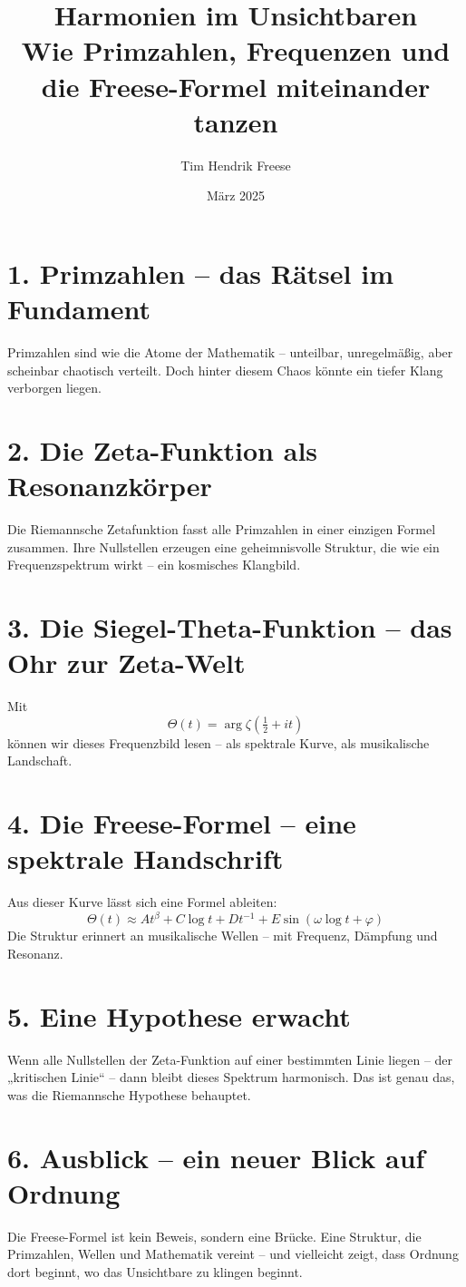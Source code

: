 \documentclass[12pt]{article}
\title{Harmonien im Unsichtbaren\\
\large Wie Primzahlen, Frequenzen und die Freese-Formel miteinander tanzen}
\author{Tim Hendrik Freese}
\date{März 2025}
\begin{document}
\maketitle

\section*{1. Primzahlen – das Rätsel im Fundament}

Primzahlen sind wie die Atome der Mathematik – unteilbar, unregelmäßig, aber scheinbar chaotisch verteilt.  
Doch hinter diesem Chaos könnte ein tiefer Klang verborgen liegen.

\section*{2. Die Zeta-Funktion als Resonanzkörper}

Die Riemannsche Zetafunktion fasst alle Primzahlen in einer einzigen Formel zusammen. Ihre Nullstellen erzeugen eine geheimnisvolle Struktur, die wie ein Frequenzspektrum wirkt – ein kosmisches Klangbild.

\section*{3. Die Siegel-Theta-Funktion – das Ohr zur Zeta-Welt}

Mit
\[
\Theta(t) = \arg \zeta\left( \tfrac{1}{2} + i t \right)
\]
können wir dieses Frequenzbild lesen – als spektrale Kurve, als musikalische Landschaft.

\section*{4. Die Freese-Formel – eine spektrale Handschrift}

Aus dieser Kurve lässt sich eine Formel ableiten:
\[
\Theta(t) \approx A t^\beta + C \log t + D t^{-1} + E \sin(\omega \log t + \varphi)
\]
Die Struktur erinnert an musikalische Wellen – mit Frequenz, Dämpfung und Resonanz.

\section*{5. Eine Hypothese erwacht}

Wenn alle Nullstellen der Zeta-Funktion auf einer bestimmten Linie liegen – der „kritischen Linie“ – dann bleibt dieses Spektrum harmonisch.  
Das ist genau das, was die Riemannsche Hypothese behauptet.

\section*{6. Ausblick – ein neuer Blick auf Ordnung}

Die Freese-Formel ist kein Beweis, sondern eine Brücke.  
Eine Struktur, die Primzahlen, Wellen und Mathematik vereint – und vielleicht zeigt, dass Ordnung dort beginnt, wo das Unsichtbare zu klingen beginnt.
\end{document}
